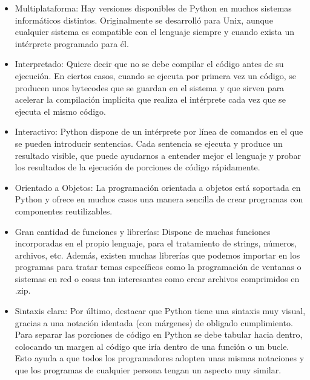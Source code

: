 \documentclass[a4paper, 12pt]{book}
\begin{document}
\begin{itemize}
\item Multiplataforma: Hay versiones disponibles de Python en muchos sistemas informáticos distintos. Originalmente se desarrolló para Unix, aunque cualquier sistema es compatible con el lenguaje siempre y cuando exista un intérprete programado para él.

\item Interpretado: Quiere decir que no se debe compilar el código antes de su ejecución. En ciertos casos, cuando se ejecuta por primera vez un código, se producen unos bytecodes que se guardan en el sistema y que sirven para acelerar la compilación implícita que realiza el intérprete cada vez que se ejecuta el mismo código.

\item Interactivo: Python dispone de un intérprete por línea de comandos en el que se pueden introducir sentencias. Cada sentencia se ejecuta y produce un resultado visible, que puede ayudarnos a entender mejor el lenguaje y probar los resultados de la ejecución de porciones de código rápidamente.

\item Orientado a Objetos: La programación orientada a objetos está soportada en Python y ofrece en muchos casos una manera sencilla de crear programas con componentes reutilizables.

\item Gran cantidad de funciones y librerías: Dispone de muchas funciones incorporadas en el propio lenguaje, para el tratamiento de strings, números, archivos, etc. Además, existen muchas librerías que podemos importar en los programas para tratar temas específicos como la programación de ventanas o sistemas en red o cosas tan interesantes como crear archivos comprimidos en .zip.

\item Sintaxis clara: Por último, destacar que Python tiene una sintaxis muy visual, gracias a una notación identada (con márgenes) de obligado cumplimiento. Para separar las porciones de código en Python se debe tabular hacia dentro, colocando un margen al código que iría dentro de una función o un bucle. Esto ayuda a que todos los programadores adopten unas mismas notaciones y que los programas de cualquier persona tengan un aspecto muy similar.
\end{itemize}




\end{document}
